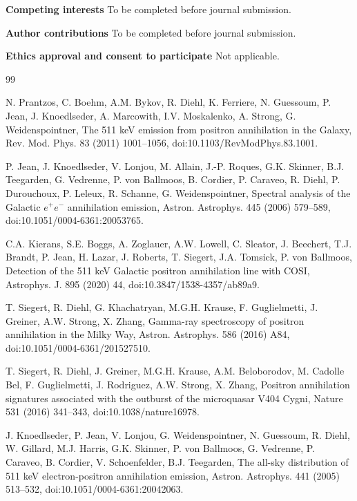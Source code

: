 \documentclass[11pt]{article}
\begin{document}
\textbf{Competing interests} To be completed before journal submission.

\textbf{Author contributions} To be completed before journal submission.

\textbf{Ethics approval and consent to participate} Not applicable.

\begin{thebibliography}{99}

N. Prantzos, C. Boehm, A.M. Bykov, R. Diehl, K. Ferriere, N. Guessoum, P. Jean, J. Knoedlseder, A. Marcowith, I.V. Moskalenko, A. Strong, G. Weidenspointner, The 511 keV emission from positron annihilation in the Galaxy, Rev. Mod. Phys. 83 (2011) 1001--1056, doi:10.1103/RevModPhys.83.1001.

P. Jean, J. Knoedlseder, V. Lonjou, M. Allain, J.-P. Roques, G.K. Skinner, B.J. Teegarden, G. Vedrenne, P. von Ballmoos, B. Cordier, P. Caraveo, R. Diehl, P. Durouchoux, P. Leleux, R. Schanne, G. Weidenspointner, Spectral analysis of the Galactic $e^+e^-$ annihilation emission, Astron. Astrophys. 445 (2006) 579--589, doi:10.1051/0004-6361:20053765.

C.A. Kierans, S.E. Boggs, A. Zoglauer, A.W. Lowell, C. Sleator, J. Beechert, T.J. Brandt, P. Jean, H. Lazar, J. Roberts, T. Siegert, J.A. Tomsick, P. von Ballmoos, Detection of the 511 keV Galactic positron annihilation line with COSI, Astrophys. J. 895 (2020) 44, doi:10.3847/1538-4357/ab89a9.

T. Siegert, R. Diehl, G. Khachatryan, M.G.H. Krause, F. Guglielmetti, J. Greiner, A.W. Strong, X. Zhang, Gamma-ray spectroscopy of positron annihilation in the Milky Way, Astron. Astrophys. 586 (2016) A84, doi:10.1051/0004-6361/201527510.

T. Siegert, R. Diehl, J. Greiner, M.G.H. Krause, A.M. Beloborodov, M. Cadolle Bel, F. Guglielmetti, J. Rodriguez, A.W. Strong, X. Zhang, Positron annihilation signatures associated with the outburst of the microquasar V404 Cygni, Nature 531 (2016) 341--343, doi:10.1038/nature16978.

J. Knoedlseder, P. Jean, V. Lonjou, G. Weidenspointner, N. Guessoum, R. Diehl, W. Gillard, M.J. Harris, G.K. Skinner, P. von Ballmoos, G. Vedrenne, P. Caraveo, B. Cordier, V. Schoenfelder, B.J. Teegarden, The all-sky distribution of 511 keV electron-positron annihilation emission, Astron. Astrophys. 441 (2005) 513--532, doi:10.1051/0004-6361:20042063.


\end{thebibliography}
\end{document}
